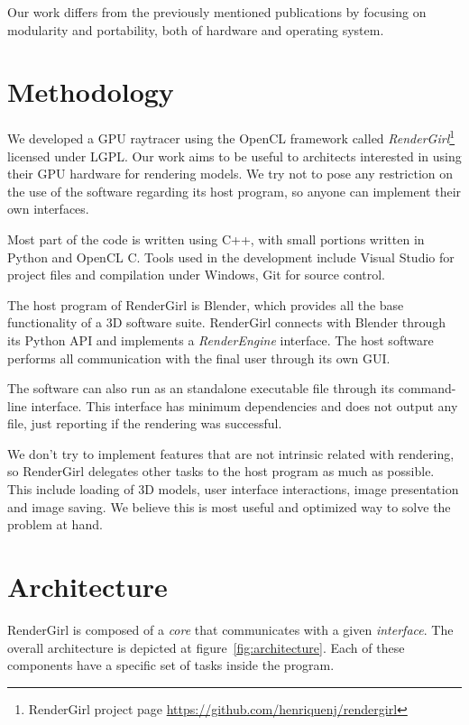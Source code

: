\documentclass{vgtc}
\begin{document}
Our work differs from the previously mentioned publications by
focusing on modularity and portability, both of hardware and operating
system.

\section{Methodology}
\label{sec:methodology}

We developed a GPU raytracer using the OpenCL framework called
\emph{RenderGirl}\footnote{RenderGirl project page
\url{https://github.com/henriquenj/rendergirl}} licensed under
LGPL. Our work aims to be useful to architects interested in using
their GPU hardware for rendering models. We try not to pose any
restriction on the use of the software regarding its host program, so
anyone can implement their own interfaces.

Most part of the code is written using C++, with small portions
written in Python and OpenCL C. Tools used in the development include
Visual Studio for project files and compilation under Windows, Git for
source control.

The host program of RenderGirl is Blender, which provides all the base
functionality of a 3D software suite. RenderGirl connects with Blender
through its Python API and implements a \emph{RenderEngine}
interface. The host software performs all communication with the final
user through its own GUI.

The software can also run as an standalone executable file through its
command-line interface. This interface has minimum dependencies and
does not output any file, just reporting if the rendering was successful.

We don't try to implement features that are not intrinsic related with
rendering, so RenderGirl delegates other tasks to the host program as
much as possible. This include loading of 3D models, user interface
interactions, image presentation and image saving. We believe this is
most useful and optimized way to solve the problem at hand.

\section{Architecture}
\label{sec:architecture}

RenderGirl is composed of a \emph{core} that communicates with a given
\emph{interface}. The overall architecture is depicted at figure~\ref{fig:architecture}. Each of these components have a specific set
of tasks inside the program.
\end{document}
